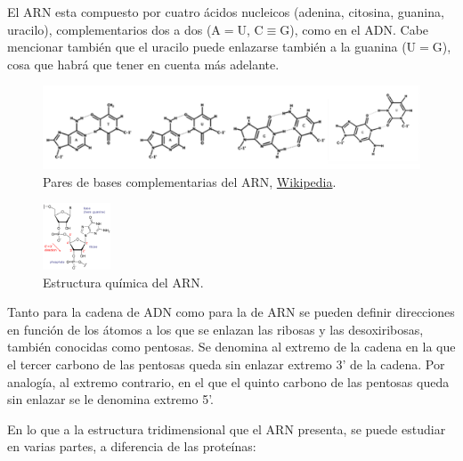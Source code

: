 \documentclass[a4paper,11pt,titlepage]{article}
\theoremstyle{definition}
\begin{document}
El ARN esta compuesto por cuatro ácidos nucleicos (adenina, citosina, guanina, uracilo), complementarios dos a dos (A$=$U, C$\equiv$G), como en el ADN. Cabe mencionar también que el uracilo puede enlazarse también a la guanina (U$=$G), cosa que habrá que tener en cuenta más adelante.

\begin{figure}[H]
    \centering
    \includegraphics[width=\textwidth]{images/RNA_base_pairs.png}
    \small{\caption{Pares de bases complementarias del ARN, \href{https://es.wikipedia.org/wiki/Apareamiento_de_bases}{Wikipedia}.}\label{fig:RNA_base_pairs}}\normalsize
\end{figure}


\begin{figure}
    \begin{center}
      \includegraphics[width=0.18\textwidth]{images/RNA_chemical_structure.png}
    \end{center}
    \small{\caption{Estructura química del ARN.}\label{fig:arnchain}}\normalsize
\end{figure}

Tanto para la cadena de ADN como para la de ARN se pueden definir direcciones en función de los átomos a los que se enlazan las ribosas y las desoxiribosas, también conocidas como pentosas. Se denomina al extremo de la cadena en la que el tercer carbono de las pentosas queda sin enlazar extremo 3' de la cadena. Por analogía, al extremo contrario, en el que el quinto carbono de las pentosas queda sin enlazar se le denomina extremo 5'.

En lo que a la estructura tridimensional que el ARN presenta, se puede estudiar en varias partes, a diferencia de las proteínas:
\end{document}
